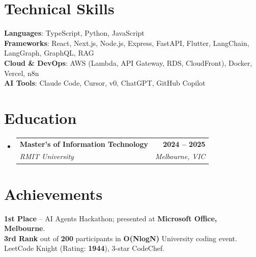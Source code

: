 \documentclass[letterpaper,11pt]{article}
\makeatletter
\newcommand{\resumeSubheading}[4]{
  \vspace{-2pt}\item
    \begin{tabular*}{1.0\textwidth}[t]{l@{\extracolsep{\fill}}r}
      \textbf{#1} & \textbf{\small #2} \\
      \textit{\small#3} & \textit{\small #4} \\
    \end{tabular*}\vspace{-7pt}
}
\newcommand{\resumeSubHeadingListStart}{\begin{itemize}[leftmargin=0.0in, label={}]}
\newcommand{\resumeSubHeadingListEnd}{\end{itemize}}
\makeatother
\begin{document}
\section{Technical Skills}
 \begin{itemize}[leftmargin=0.15in, label={}]
    \small{\item{
     \textbf{Languages}{: TypeScript, Python, JavaScript} \\
     \textbf{Frameworks}{: React, Next.js, Node.js, Express, FastAPI, Flutter, LangChain, LangGraph, GraphQL, RAG} \\
     \textbf{Cloud \& DevOps}{: AWS (Lambda, API Gateway, RDS, CloudFront), Docker, Vercel, n8n} \\
     \textbf{AI Tools}{: Claude Code, Cursor, v0, ChatGPT, GitHub Copilot} \\
    }}
 \end{itemize}
 \vspace{-16pt}

\section{Education}
  \resumeSubHeadingListStart
    \resumeSubheading
      {Master's of Information Technology}{2024 -- 2025}
      {RMIT University}{Melbourne, VIC}
  \resumeSubHeadingListEnd
\vspace{-4pt}

\section{Achievements}
 \begin{itemize}[leftmargin=0.15in, label={}]
    \small{\item{
     \textbf{1st Place} -- AI Agents Hackathon; presented at \textbf{Microsoft Office, Melbourne}. \\
     \textbf{3rd Rank} out of \textbf{200} participants in \textbf{O(NlogN)} University coding event. \\
     LeetCode Knight (Rating: \textbf{1944}), 3-star CodeChef. \\
    }}
 \end{itemize}
\end{document}
